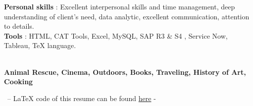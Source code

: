 \documentclass[11pt]{formatting/format} %
\begin{document}
\color{text}\textbf{Personal skills} : {Excellent interpersonal skills and time management, deep understanding of client's need, data analytic, excellent communication, attention to details. }\\

\color{text}\textbf{Tools} : HTML, CAT Tools, Excel, MySQL, SAP R3 \& S4 , Service Now, Tableau, TeX language.




\\
\small\textbf{Animal Rescue, Cinema, Outdoors, Books, Traveling, History of Art, Cooking}  


\begin{center} 
\color{text}\footnotesize\ -- LaTeX code of this resume can be found \color{illustration}\href{https://github.com/DGloi/TexResumeTemplate}{here} \color{text} -\end{center}



\end{document}
